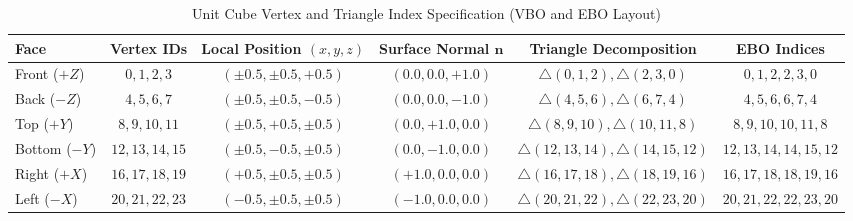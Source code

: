 \documentclass[11pt,a4paper]{article}
\begin{document}
\begin{table}[H]
\centering
\scriptsize
\caption{Unit Cube Vertex and Triangle Index Specification (VBO and EBO Layout)}
\label{tab:cube_vertices}
\begin{tabular}{lccccc}
\toprule
\rowcolor{tableheader}
\textcolor{tableheadertext}{\textbf{Face}} & 
\textcolor{tableheadertext}{\textbf{Vertex IDs}} & 
\textcolor{tableheadertext}{\textbf{Local Position $(x,y,z)$}} & 
\textcolor{tableheadertext}{\textbf{Surface Normal $\mathbf{n}$}} & 
\textcolor{tableheadertext}{\textbf{Triangle Decomposition}} & 
\textcolor{tableheadertext}{\textbf{EBO Indices}} \\
\midrule
\rowcolor{lightgraybg}
Front ($+Z$) & $0, 1, 2, 3$ & $(\pm 0.5, \pm 0.5, +0.5)$ & $(0.0, 0.0, +1.0)$ & $\triangle(0,1,2), \triangle(2,3,0)$ & $0,1,2, 2,3,0$ \\
Back ($-Z$)  & $4, 5, 6, 7$ & $(\pm 0.5, \pm 0.5, -0.5)$ & $(0.0, 0.0, -1.0)$ & $\triangle(4,5,6), \triangle(6,7,4)$ & $4,5,6, 6,7,4$ \\
\rowcolor{lightgraybg}
Top ($+Y$)   & $8, 9, 10, 11$ & $(\pm 0.5, +0.5, \pm 0.5)$ & $(0.0, +1.0, 0.0)$ & $\triangle(8,9,10), \triangle(10,11,8)$ & $8,9,10, 10,11,8$ \\
Bottom ($-Y$)& $12, 13, 14, 15$ & $(\pm 0.5, -0.5, \pm 0.5)$ & $(0.0, -1.0, 0.0)$ & $\triangle(12,13,14), \triangle(14,15,12)$ & $12,13,14, 14,15,12$ \\
\rowcolor{lightgraybg}
Right ($+X$) & $16, 17, 18, 19$ & $(+0.5, \pm 0.5, \pm 0.5)$ & $(+1.0, 0.0, 0.0)$ & $\triangle(16,17,18), \triangle(18,19,16)$ & $16,17,18, 18,19,16$ \\
Left ($-X$)  & $20, 21, 22, 23$ & $(-0.5, \pm 0.5, \pm 0.5)$ & $(-1.0, 0.0, 0.0)$ & $\triangle(20,21,22), \triangle(22,23,20)$ & $20,21,22, 22,23,20$ \\
\bottomrule
\end{tabular}
\end{table}
\end{document}

